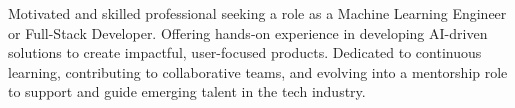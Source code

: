 


\begin{cvparagraph}
  Motivated and skilled professional seeking a role as a Machine Learning Engineer or Full-Stack Developer. Offering hands-on experience in developing AI-driven solutions to create impactful, user-focused products. Dedicated to continuous learning, contributing to collaborative teams, and evolving into a mentorship role to support and guide emerging talent in the tech industry.
\end{cvparagraph}

